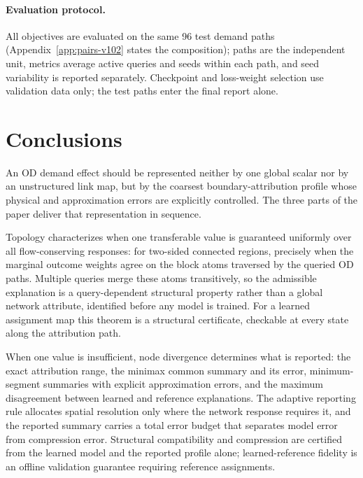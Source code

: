 \documentclass[a4paper,fleqn]{cas-sc}
\begin{document}
\paragraph{Evaluation protocol.}
All objectives are evaluated on the same 96 test demand paths
(Appendix~\ref{app:pairs-v102} states the composition); paths are
the independent unit, metrics average active queries and seeds within
each path, and seed variability is reported separately. Checkpoint and
loss-weight selection use validation data only; the test paths enter
the final report alone.



\FloatBarrier
\section{Conclusions}\label{sec:conclusions}
An OD demand effect should be represented neither by one global scalar
nor by an unstructured link map, but by the coarsest
boundary-attribution profile whose physical and approximation errors
are explicitly controlled. The three parts of the paper deliver that
representation in sequence.

Topology characterizes when one transferable value is guaranteed
uniformly over all flow-conserving responses: for two-sided connected
regions, precisely when the marginal outcome weights agree on the block
atoms traversed by the queried OD paths. Multiple queries merge these
atoms transitively, so the admissible explanation is a query-dependent
structural property rather than a global network attribute, identified
before any model is trained. For a learned assignment map this theorem
is a structural certificate, checkable at every state along the
attribution path.

When one value is insufficient, node divergence determines what is
reported: the exact attribution range, the minimax common summary and
its error, minimum-segment summaries with explicit approximation
errors, and the maximum disagreement between learned and reference
explanations. The adaptive reporting rule allocates spatial resolution
only where the network response requires it, and the reported summary
carries a total error budget that separates model error from
compression error. Structural compatibility and compression are
certified from the learned model and the reported profile alone;
learned-reference fidelity is an offline validation guarantee requiring
reference assignments.
\end{document}
